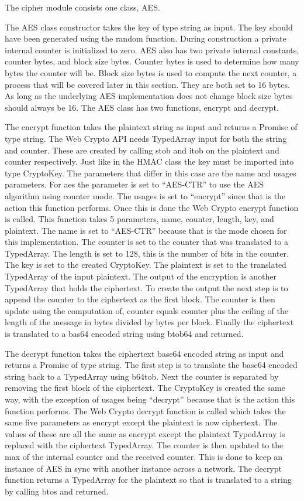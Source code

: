 The cipher module consists one class, AES.


The AES class constructor takes the key of type string as input. The key should have been generated using the random function. During construction a private internal counter is initialized to zero. AES also has two private internal constants, counter bytes, and block size bytes. Counter bytes is used to determine how many bytes the counter will be. Block size bytes is used to compute the next counter, a process that will be covered later in this section. They are both set to 16 bytes. As long as the underlying AES implementation does not change block size bytes should always be 16. The AES class has two functions, encrypt and decrypt.


The encrypt function takes the plaintext string as input and returns a Promise of type string. The Web Crypto API needs TypedArray input for both the string and counter. These are created by calling stob and itob on the plaintext and counter respectively. Just like in the HMAC class the key must be imported into type CryptoKey. The parameters that differ in this case are the name and usages parameters. For aes the parameter is set to “AES-CTR” to use the AES algorithm using counter mode. The usages is set to “encrypt” since that is the action this function performs. Once this is done the Web Crypto encrypt function is called. This function takes 5 parameters, name, counter, length, key, and plaintext. The name is set to “AES-CTR” because that is the mode chosen for this implementation. The counter is set to the counter that was translated to a TypedArray. The length is set to 128, this is the number of bits in the counter. The key is set to the created CryptoKey. The plaintext is set to the translated TypedArray of the input plaintext. The output of the encryption is another TypedArray that holds the ciphertext. To create the output the next step is to append the counter to the ciphertext as the first block. The counter is then update using the computation of, counter equals counter plus the ceiling of the length of the message in bytes divided by bytes per block. Finally the ciphertext is translated to a bas64 encoded string using btob64 and returned.


The decrypt function takes the ciphertext base64 encoded string as input and returns a Promise of type string. The first step is to translate the base64 encoded string back to a TypedArray using b64tob. Next the counter is separated by removing the first block of the ciphertext. The CryptoKey is created the same way, with the exception of usages being “decrypt” because that is the action this function performs. The Web Crypto decrypt function is called which takes the same five parameters as encrypt except the plaintext is now ciphertext. The values of these are all the same as encrypt except the plaintext TypedArray is replaced with the ciphertext TypedArray. The counter is then updated to the max of the internal counter and the received counter. This is done to keep an instance of AES in sync with another instance across a network. The decrypt function returns a TypedArray for the plaintext so that is translated to a string by calling btos and returned.


